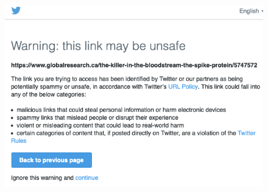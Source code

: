 \documentclass[11pt,a4paper]{article}
\begin{document}
\begin{figure}
\begin{multicols}{2}
		\includegraphics[scale=0.2]{./img/globalresearch/warning.png}
	\end{multicols}
\caption{}
\label{fig4}
\end{figure}
\end{document}
